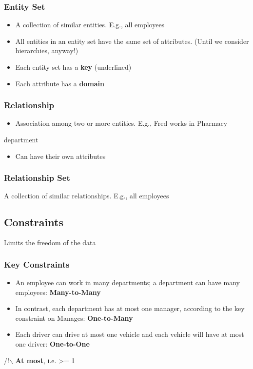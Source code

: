 \documentclass[11pt]{article}
\begin{document}
\subsubsection{Entity Set}
\label{sec:org796867f}
\begin{itemize}
\item A collection of similar entities. E.g., all employees
\item All entities in an entity set have the same set of attributes. (Until we
consider hierarchies, anyway!)
\item Each entity set has a \textbf{key} (underlined)
\item Each attribute has a \textbf{domain}
\end{itemize}
\subsubsection{Relationship}
\label{sec:orgc6acdbf}
\begin{itemize}
\item Association among two or more entities. E.g., Fred works in Pharmacy
\end{itemize}
department
\begin{itemize}
\item Can have their own attributes
\end{itemize}
\subsubsection{Relationship Set}
\label{sec:org4251109}
A collection of similar relationships. E.g., all employees
\subsection{Constraints}
\label{sec:org4d248fa}
Limits the freedom of the data
\subsubsection{Key Constraints}
\label{sec:org289e67c}
\begin{itemize}
\item An employee can work in many departments; a department can have many
employees: \textbf{Many-to-Many}
\item In contrast, each department has at most one manager, according to the key
constraint on Manages: \textbf{One-to-Many}
\item Each driver can drive at most one vehicle and each vehicle will have at most
one driver: \textbf{One-to-One}
\end{itemize}
/!$\backslash$ \textbf{At most}, i.e. >= 1
\end{document}
